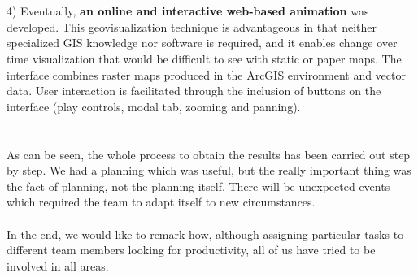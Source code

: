 \\
\\
4) Eventually, {\bf an online and interactive web-based animation} was developed. This geovisualization technique is advantageous in that neither specialized GIS knowledge nor software is required, and it enables change over time visualization that would be difficult to see with static or paper maps. The interface combines raster maps produced in the ArcGIS environment and vector data. User interaction is facilitated through the inclusion of buttons on the interface (play controls, modal tab, zooming and panning).
\\
\\
\\
As can be seen, the whole process to obtain the results has been carried out step by step. We had a planning which was useful, but the really important thing was the fact of planning, not the planning itself. There will be unexpected events which required the team to adapt itself to new circumstances.
\\
\\
In the end, we would like to remark how, although assigning particular tasks to different team members looking for productivity, all of us have tried to be involved in all areas.
\\
\\